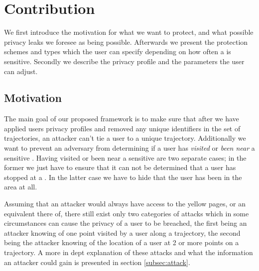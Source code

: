 \section{Contribution} \label{sec:contribution}

% 
% 


We first introduce the motivation for what we want to protect, and what possible privacy leaks we foresee as being possible. Afterwards we present the protection schemes and types which the user can specify depending on how often a \poi is sensitive. Secondly we describe the privacy profile and the parameters the user can adjust. 


\subsection{Motivation}
The main goal of our proposed framework is to make sure that after we have applied users privacy profiles and removed any unique identifiers in the set of trajectories, an attacker can't tie a user to a unique trajectory. Additionally we want to prevent an adversary from determining if a user has \textit{visited} or \textit{been near} a sensitive \poins. Having visited or been near a sensitive \poi are two separate cases; in the former we just have to ensure that it can not be determined that a user has stopped at a \poins. In the latter case we have to hide that the user has been in the area at all. 

Assuming that an attacker would always have access to the yellow pages, or an equivalent there of, there still exist only two categories of attacks which in some circumstances can cause the privacy of a user to be breached,  the first being an attacker knowing of one point visited by a user along a trajectory, the second being the attacker knowing of the location of a user at 2 or more points on a trajectory.
A more in dept explanation of these attacks and what the information an attacker could gain is presented in section \ref{subsec:attack}.

